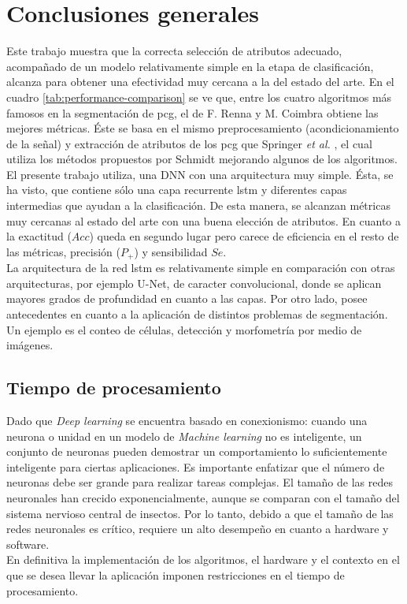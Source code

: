 \chapter{Conclusiones generales}

\indent Este trabajo muestra que la correcta selección de atributos adecuado, acompañado de un modelo relativamente
simple en la etapa de clasificación, alcanza para obtener una efectividad muy cercana a la del estado del arte. En
el cuadro \ref{tab:performance-comparison} se ve que, entre los cuatro algoritmos más famosos en la segmentación de
\acrshort{pcg}, el de F. Renna y M. Coimbra \cite{pp:renna2018} obtiene las mejores métricas. Éste se basa en el
mismo preprocesamiento (acondicionamiento de la señal) y extracción de atributos de los \acrshort{pcg} que Springer
\textit{et al.} \cite{pp:springer2015}, el cual utiliza los métodos propuestos por Schmidt \cite{pp:schmidt2010}
mejorando algunos de los algoritmos. \\
\indent El presente trabajo utiliza, una DNN con una arquitectura muy simple.
Ésta, se ha visto, que contiene sólo una capa recurrente \acrshort{lstm} y diferentes capas intermedias que ayudan a
la clasificación. De esta manera, se alcanzan métricas muy cercanas al estado del arte con una buena elección de
atributos. En cuanto a la exactitud ($Acc$) queda en segundo lugar pero carece de eficiencia en el resto de las
métricas, precisión ($P_+$) y sensibilidad $Se$. \\
\indent La arquitectura de la red \acrshort{lstm} es relativamente simple en comparación con otras arquitecturas,
por ejemplo U-Net, de caracter convolucional, donde se aplican mayores grados de profundidad en cuanto a las capas.
Por otro lado, posee antecedentes en cuanto a la aplicación de distintos problemas de segmentación. Un ejemplo es el
conteo de células, detección y morfometría por medio de imágenes.

\section{Tiempo de procesamiento}

\indent Dado que \textit{Deep learning} se encuentra basado en conexionismo: cuando una neurona o unidad en un
modelo de \textit{Machine learning} no es inteligente, un conjunto de neuronas pueden demostrar un comportamiento lo
suficientemente inteligente para ciertas aplicaciones. Es importante enfatizar que el número de neuronas debe ser
grande para realizar tareas complejas. El tamaño de las redes neuronales han crecido exponencialmente, aunque se
comparan con el tamaño del sistema nervioso central de insectos. Por lo tanto, debido a que el tamaño de las redes
neuronales es crítico, requiere un alto desempeño en cuanto a hardware y software. \\
\indent En definitiva la implementación de los algoritmos, el hardware y el contexto en el que se desea llevar la
aplicación imponen restricciones en el tiempo de procesamiento.

